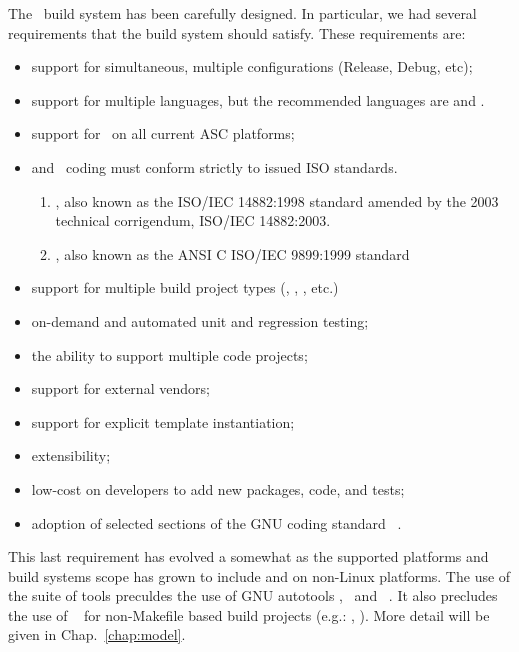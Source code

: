 The \draco\ build system has been carefully designed.  In particular,
we had several requirements that the build system should satisfy.
These requirements are:
\begin{itemize}
  \item support for simultaneous, multiple configurations (Release, Debug, etc);
  \item support for multiple languages, but the recommended languages are  and \cpp.
  \item support for \cpp\ on all current ASC platforms;
  \item {} and \cpp\ coding must conform strictly to issued ISO standards.
\begin{enumerate}
\item {}, also known as the ISO/IEC 14882:1998 standard amended by the 2003 technical corrigendum, ISO/IEC 14882:2003.
\item {}, also known as the ANSI C ISO/IEC 9899:1999 standard
\end{enumerate}
  \item support for multiple build project types (, , , etc.)
\item on-demand and automated unit and regression testing;
\item the ability to support multiple code projects;
\item support for external vendors;
  \item support for explicit template instantiation;
\item extensibility;
\item low-cost on developers to add new packages, code, and tests; 
\item  adoption of selected sections of the GNU coding standard~\cite{gnu} .
\end{itemize}
This last requirement has evolved a somewhat as the supported
platforms and build systems scope has grown to include   and
  on non-Linux platforms.  The use of the \cmake {} suite of tools
preculdes the use of GNU autotools ,
\autoconf\ and \automake~\cite{autoconf}.  
It also precludes the use of \make~\cite{gmake} for non-Makefile based
build projects (e.g.: , ). More detail will be given in
Chap.~\ref{chap:model}. 


